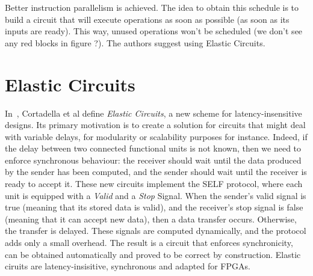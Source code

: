 \documentclass{article}
\begin{document}
Better instruction parallelism is achieved. The idea to obtain this schedule is to build a circuit that will execute operations as soon as possible (as soon as its inputs are ready). This way, unused operations won't be scheduled (we don't see any red blocks in figure ?). The authors suggest using Elastic Circuits.

\section{Elastic Circuits}

In~\cite{DBLP:conf/dac/CortadellaKG06}, Cortadella et al define \textit{Elastic Circuits}, a new scheme for latency-insensitive designs.
Its primary motivation is to create a solution for circuits that might deal with variable delays, for modularity or scalability purposes for instance.
Indeed, if the delay between two connected functional units is not known, then we need to enforce synchronous behaviour: the receiver should wait until the data produced by the sender has been computed, and the sender should wait until the receiver is ready to accept it.
These new circuits implement the SELF protocol, where each unit is equipped with a \textit{Valid} and a \textit{Stop} Signal. When the sender's valid signal is true (meaning that its stored data is valid), and the receiver's stop signal is false (meaning that it can accept new data), then a data transfer occurs. Otherwise, the transfer is delayed. These signals are computed dynamically, and the protocol adds only a small overhead. The result is a circuit that enforces synchronicity, can be obtained automatically and proved to be correct by construction. Elastic ciruits are latency-insisitive, synchronous and adapted for FPGAs.
\end{document}

